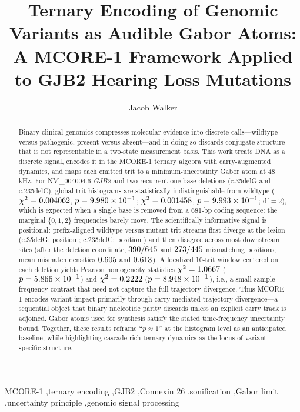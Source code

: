\documentclass[preprint,12pt]{elsarticle}
\begin{document}
\begin{frontmatter}

\title{Ternary Encoding of Genomic Variants as Audible Gabor Atoms: A MCORE-1 Framework Applied to GJB2 Hearing Loss Mutations}

\author{Jacob Walker}
\address{Symonic LLC, Simpsonville, SC, United States}

\begin{abstract}
Binary clinical genomics compresses molecular evidence into discrete calls---wildtype versus pathogenic, present versus absent---and in doing so discards conjugate structure that is not representable in a two-state measurement basis. This work treats DNA as a discrete signal, encodes it in the MCORE-1 ternary algebra with carry-augmented dynamics, and maps each emitted trit to a minimum-uncertainty Gabor atom at 48\,kHz. For NM\_004004.6 \textit{GJB2} and two recurrent one-base deletions (c.35delG and c.235delC), global trit histograms are statistically indistinguishable from wildtype ($\chi^2=0.004062$, $p=9.980 \times 10^{-1}$; $\chi^2=0.001458$, $p=9.993 \times 10^{-1}$; df$=2$), which is expected when a single base is removed from a 681-bp coding sequence: the marginal $\{0,1,2\}$ frequencies barely move. The scientifically informative signal is positional: prefix-aligned wildtype versus mutant trit streams first diverge at the lesion (c.35delG: position \FirstDiffCThirtyFive; c.235delC: position \FirstDiffCTwoThirtyFive) and then disagree across most downstream sites (after the deletion coordinate, $390/645$ and $273/445$ mismatching positions; mean mismatch densities $0.605$ and $0.613$). A localized 10-trit window centered on each deletion yields Pearson homogeneity statistics $\chi^2=1.0667$ ($p=5.866 \times 10^{-1}$) and $\chi^2=0.2222$ ($p=8.948 \times 10^{-1}$), i.e., a small-sample frequency contrast that need not capture the full trajectory divergence. Thus MCORE-1 encodes variant impact primarily through carry-mediated trajectory divergence---a sequential object that binary nucleotide parity discards unless an explicit carry track is adjoined. Gabor atoms used for synthesis satisfy the stated time-frequency uncertainty bound. Together, these results reframe ``$p\approx 1$'' at the histogram level as an anticipated baseline, while highlighting cascade-rich ternary dynamics as the locus of variant-specific structure.
\end{abstract}

\begin{keyword}
MCORE-1 \sep ternary encoding \sep GJB2 \sep Connexin 26 \sep sonification \sep Gabor limit \sep uncertainty principle \sep genomic signal processing
\end{keyword}

\end{frontmatter}
\end{document}
